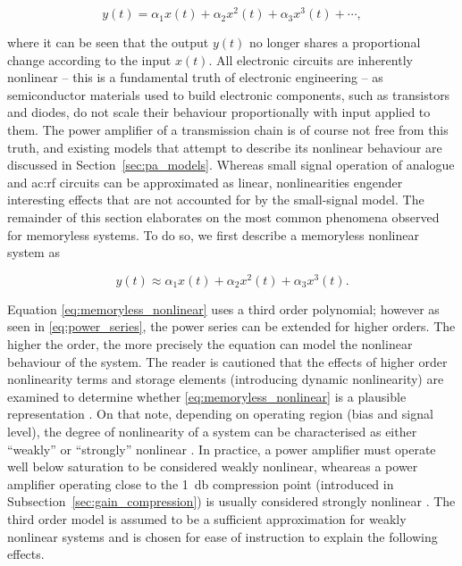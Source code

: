 \begin{equation}
  y(t) = \alpha_1 x(t) + \alpha_2 x^2(t) + \alpha_3 x^3(t) + \dotsb, 
  \label{eq:power_series}
\end{equation}

where it can be seen that the output $y(t)$ no longer shares a proportional change according to the input $x(t)$.  All electronic circuits are inherently nonlinear -- this is a fundamental truth of electronic engineering \cite{maas} -- as semiconductor materials used to build electronic components, such as transistors and diodes, do not scale their behaviour proportionally with input applied to them. The power amplifier of a transmission chain is of course not free from this truth, and existing models that attempt to describe its nonlinear behaviour are discussed in Section~\ref{sec:pa_models}. Whereas small signal operation of analogue and \gls{ac:rf} circuits can be approximated as linear, nonlinearities engender interesting effects that are not accounted for by the small-signal model. The remainder of this section elaborates on the most common phenomena observed for memoryless systems. To do so, we first describe a memoryless nonlinear system as \cite{razavi}

\begin{equation}
  y(t) \approx \alpha_1 x(t) + \alpha_2 x^2(t) + \alpha_3 x^3(t).
  \label{eq:memoryless_nonlinear}
\end{equation}

Equation \eqref{eq:memoryless_nonlinear} uses a third order polynomial; however as seen in \eqref{eq:power_series}, the power series can be extended for higher orders. The higher the order, the more precisely the equation can model the nonlinear behaviour of the system. The reader is cautioned that the effects of higher order nonlinearity terms and storage elements (introducing dynamic nonlinearity) are examined to determine whether \eqref{eq:memoryless_nonlinear} is a plausible representation \cite{razavi}. On that note, depending on operating region (bias and signal level), the degree of nonlinearity of a system can be characterised as either ``weakly'' or ``strongly'' nonlinear \cite{shi2000scs}. In practice, a power amplifier must operate well below saturation to be considered weakly nonlinear, wheareas a power amplifier operating close to the \qty{1}{\decibel} compression point (introduced in Subsection~\ref{sec:gain_compression}) is usually considered strongly nonlinear \cite{miehle}. The third order model is assumed to be a sufficient approximation for weakly nonlinear systems and is chosen for ease of instruction to explain the following effects. 

